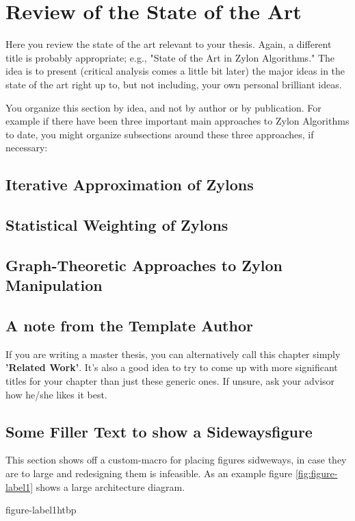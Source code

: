 \chapter{Review of the State of the Art}
\label{chap:relatedwork}
Here you review the state of the art relevant to your thesis. Again, a
different title is probably appropriate; e.g., "State of the Art in Zylon
Algorithms." The idea is to present (critical analysis comes a little bit
later) the major ideas in the state of the art right up to, but not including,
your own personal brilliant ideas.

You organize this section by idea, and not by author or by publication. For
example if there have been three important main approaches to Zylon Algorithms
to date, you might organize subsections around these three approaches, if
necessary:

\section{Iterative Approximation of Zylons}
\blindtext 

\section{Statistical Weighting of Zylons}
\blindtext

\section{Graph-Theoretic Approaches to Zylon Manipulation}
\blindtext

\section{A note from the Template Author}
If you are writing a master thesis, you can alternatively call this chapter
simply \textbf{'Related Work'}. It's also a good idea to try to come up with
more significant titles for your chapter than just these generic ones. If
unsure, ask your advisor how he/she likes it best.

\section{Some Filler Text to show a Sidewaysfigure}
This section shows off a custom-macro for placing figures sidweways, in case
they are to large and redesigning them is infeasible. As an example figure
\ref{fig:figure-label1} shows a large architecture diagram. 

\Blindtext

%
{figure-label1}{htbp}{%
            
}

\Blindtext

